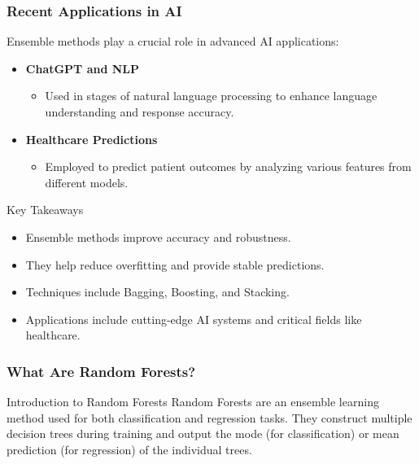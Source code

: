 \documentclass[aspectratio=169]{beamer}
\begin{document}
\begin{frame}[fragile]
    \frametitle{Recent Applications in AI}
    
    Ensemble methods play a crucial role in advanced AI applications:
    \begin{itemize}
        \item \textbf{ChatGPT and NLP} 
            \begin{itemize}
                \item Used in stages of natural language processing to enhance language understanding and response accuracy.
            \end{itemize}
        \item \textbf{Healthcare Predictions} 
            \begin{itemize}
                \item Employed to predict patient outcomes by analyzing various features from different models.
            \end{itemize}
    \end{itemize}
    
    \begin{block}{Key Takeaways}
        \begin{itemize}
            \item Ensemble methods improve accuracy and robustness.
            \item They help reduce overfitting and provide stable predictions.
            \item Techniques include Bagging, Boosting, and Stacking.
            \item Applications include cutting-edge AI systems and critical fields like healthcare.
        \end{itemize}
    \end{block}
    
\end{frame}

\begin{frame}[fragile]
    \frametitle{What Are Random Forests?}
    \begin{block}{Introduction to Random Forests}
        Random Forests are an ensemble learning method used for both classification and regression tasks. They construct multiple decision trees during training and output the mode (for classification) or mean prediction (for regression) of the individual trees.
    \end{block}
\end{frame}
\end{document}
